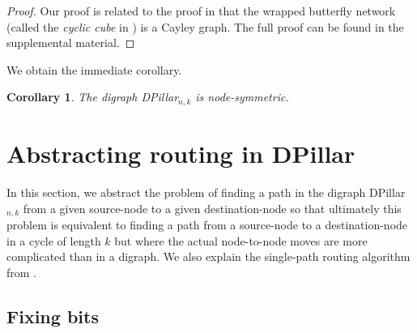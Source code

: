 \documentclass{article}
\newtheorem{corollary}[definition]{Corollary}
\begin{document}
\begin{proof}
  Our proof is related to the proof in \cite{FC98} that the wrapped butterfly
  network (called the \emph{cyclic cube} in \cite{FC98}) is a Cayley graph.
  The full proof can be found in the supplemental material.
\end{proof}

We obtain the immediate corollary.

\begin{corollary}\label{lem:sym}
The digraph DPillar$_{n,k}$ is node-symmetric.
\end{corollary}








\section{Abstracting routing in DPillar}\label{sec:routing}

In this section, we abstract the problem of finding a path in the digraph DPillar$_{n,k}$ from a given source-node to a given destination-node so that ultimately this problem is equivalent to finding a path from a source-node to a destination-node in a cycle of length $k$ but where the actual node-to-node moves are more complicated than in a digraph. We also explain the single-path routing algorithm from \cite{LYY12}.

\subsection{Fixing bits}
\end{document}
